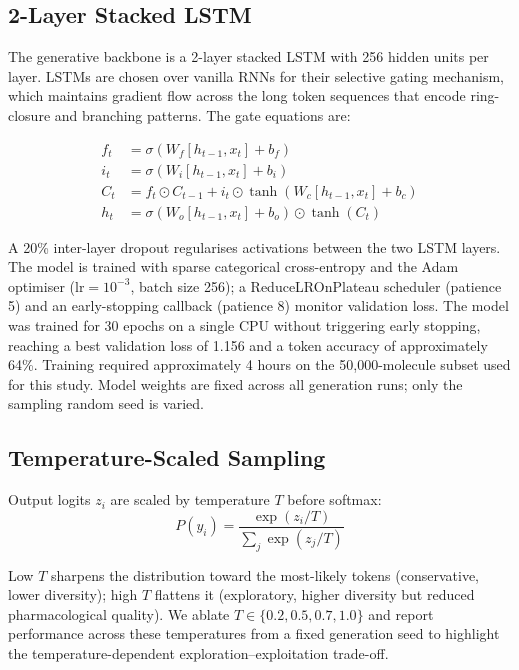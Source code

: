 \documentclass[conference]{IEEEtran}
\begin{document}
\subsection{2-Layer Stacked LSTM}

The generative backbone is a 2-layer stacked LSTM with 256 hidden units per layer. LSTMs are chosen over vanilla RNNs for their selective gating mechanism, which maintains gradient flow across the long token sequences that encode ring-closure and branching patterns. The gate equations are:

\begin{align}
f_t &= \sigma(W_f [h_{t-1}, x_t] + b_f) \\
i_t &= \sigma(W_i [h_{t-1}, x_t] + b_i) \\
C_t &= f_t \odot C_{t-1} + i_t \odot \tanh(W_c [h_{t-1}, x_t] + b_c) \\
h_t &= \sigma(W_o [h_{t-1}, x_t] + b_o) \odot \tanh(C_t)
\end{align}

A 20\% inter-layer dropout regularises activations between the two LSTM layers. The model is trained with sparse categorical cross-entropy and the Adam optimiser ($\text{lr} = 10^{-3}$, batch size 256); a ReduceLROnPlateau scheduler (patience 5) and an early-stopping callback (patience 8) monitor validation loss. The model was trained for 30 epochs on a single CPU without triggering early stopping, reaching a best validation loss of 1.156 and a token accuracy of approximately 64\%. Training required approximately 4 hours on the 50,000-molecule subset used for this study. Model weights are fixed across all generation runs; only the sampling random seed is varied.

\subsection{Temperature-Scaled Sampling}

Output logits $z_i$ are scaled by temperature $T$ before softmax:
\begin{equation}
P(y_i) = \frac{\exp(z_i / T)}{\sum_j \exp(z_j / T)}
\end{equation}

Low $T$ sharpens the distribution toward the most-likely tokens (conservative, lower diversity); high $T$ flattens it (exploratory, higher diversity but reduced pharmacological quality). We ablate $T \in \{0.2, 0.5, 0.7, 1.0\}$ and report performance across these temperatures from a fixed generation seed to highlight the temperature-dependent exploration--exploitation trade-off.
\end{document}
